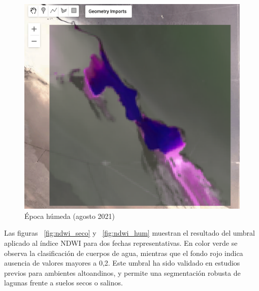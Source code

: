 \begin{figure}[ht]
        \centering
        \includegraphics[scale=.37]
        {Figures/fig7_hum.png}
        \caption{Época húmeda (agosto 2021)}
        \label{fig:epoca_humeda}
\end{figure}



Las figuras ~\ref{fig:ndwi_seco} y ~\ref{fig:ndwi_hum}  muestran el resultado del umbral aplicado al índice NDWI para dos fechas representativas. En color verde se observa la clasificación de cuerpos de agua, mientras que el fondo rojo indica ausencia de valores mayores a 0,2. Este umbral ha sido validado en estudios previos para ambientes altoandinos, y permite una segmentación robusta de lagunas frente a suelos secos o salinos.



